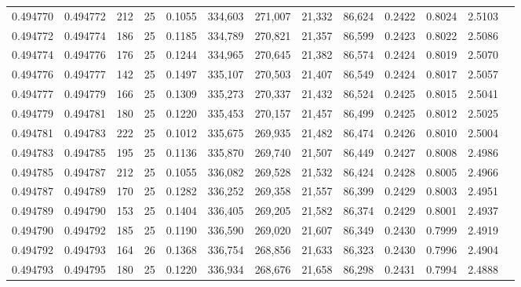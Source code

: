 \begin{tabular}{rrrrrrrrrrrrr}
0.494770 & 0.494772 &   212 &  25 &                                     0.1055 & 334,603 & 271,007 &  21,332 &  86,624 & 0.2422 & 0.8024 & 2.5103 \\
0.494772 & 0.494774 &   186 &  25 &                                     0.1185 & 334,789 & 270,821 &  21,357 &  86,599 & 0.2423 & 0.8022 & 2.5086 \\
0.494774 & 0.494776 &   176 &  25 &                                     0.1244 & 334,965 & 270,645 &  21,382 &  86,574 & 0.2424 & 0.8019 & 2.5070 \\
0.494776 & 0.494777 &   142 &  25 &                                     0.1497 & 335,107 & 270,503 &  21,407 &  86,549 & 0.2424 & 0.8017 & 2.5057 \\
0.494777 & 0.494779 &   166 &  25 &                                     0.1309 & 335,273 & 270,337 &  21,432 &  86,524 & 0.2425 & 0.8015 & 2.5041 \\
0.494779 & 0.494781 &   180 &  25 &                                     0.1220 & 335,453 & 270,157 &  21,457 &  86,499 & 0.2425 & 0.8012 & 2.5025 \\
0.494781 & 0.494783 &   222 &  25 &                                     0.1012 & 335,675 & 269,935 &  21,482 &  86,474 & 0.2426 & 0.8010 & 2.5004 \\
0.494783 & 0.494785 &   195 &  25 &                                     0.1136 & 335,870 & 269,740 &  21,507 &  86,449 & 0.2427 & 0.8008 & 2.4986 \\
0.494785 & 0.494787 &   212 &  25 &                                     0.1055 & 336,082 & 269,528 &  21,532 &  86,424 & 0.2428 & 0.8005 & 2.4966 \\
0.494787 & 0.494789 &   170 &  25 &                                     0.1282 & 336,252 & 269,358 &  21,557 &  86,399 & 0.2429 & 0.8003 & 2.4951 \\
0.494789 & 0.494790 &   153 &  25 &                                     0.1404 & 336,405 & 269,205 &  21,582 &  86,374 & 0.2429 & 0.8001 & 2.4937 \\
0.494790 & 0.494792 &   185 &  25 &                                     0.1190 & 336,590 & 269,020 &  21,607 &  86,349 & 0.2430 & 0.7999 & 2.4919 \\
0.494792 & 0.494793 &   164 &  26 &                                     0.1368 & 336,754 & 268,856 &  21,633 &  86,323 & 0.2430 & 0.7996 & 2.4904 \\
0.494793 & 0.494795 &   180 &  25 &                                     0.1220 & 336,934 & 268,676 &  21,658 &  86,298 & 0.2431 & 0.7994 & 2.4888 \\

\end{tabular}
